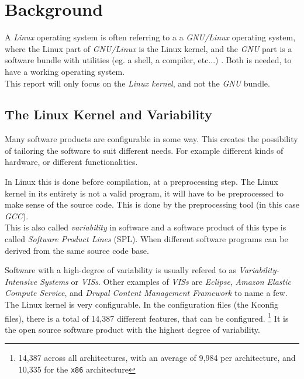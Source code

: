 \documentclass[a4paper,11pt]{report}
\begin{document}
        \chapter{Background}

A \emph{Linux} operating system is often referring to a a \emph{GNU/Linux} 
operating system, where the Linux part of \emph{GNU/Linux} is the Linux kernel, 
and the \emph{GNU} part is a software bundle with utilities (eg. a shell, a 
compiler, etc...) \cite{gnupack}. Both is 
needed, to have a working operating system. 
\\

This report will only focus on the \emph{Linux kernel}, and not the \emph{GNU} 
bundle.


        \section{The Linux Kernel and Variability}

Many software products are configurable in some way. This creates the 
possibility of tailoring the software to suit different needs. For example 
different kinds of hardware, or different functionalities. 

In Linux this is done before compilation, at a preprocessing step. The Linux 
kernel in its entirety is not a valid program, it will have to be preprocessed 
to make sense of the source code.
This is done by the preprocessing tool (in this case \emph{GCC}).
    \cite[p. 1]{IntDatSPL}
\\

This is also called \emph{variability} in software and a software product of 
this type is called \emph{Software Product Lines} (SPL). When different 
software programs can be derived from the same source code base. 

Software with a high-degree of variability is usually refered to as 
\emph{Variability-Intensive Systems} or \emph{VISs}. Other examples of 
\emph{VISs} are \emph{Eclipse}, \emph{Amazon Elastic Compute Service}, and 
\emph{Drupal Content Management Framework} 
    \cite[p. 1]{VarTesDrupal}
to name a few.
\\

The Linux kernel is very configurable. In the configuration files (the Kconfig 
files), there is a total of 14,387 different features, that can be configured.
    \footnote {14,387 across all architectures, with an average of 9,984 per 
        architecture, and 10,335 for the \texttt{x86} architecture}
It is the open source software product with the highest degree of variability.
\end{document}
